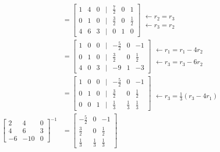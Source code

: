 \documentclass[12pt]{article}
\begin{document}
\begin{enumerate}
\begin{align*}
        \\ &= \begin{bmatrix}
            1& 4 &0 &|& \frac{7}{2} & 0&1
            \\ 0& 1 &0 &|& \frac{3}{2}&0&\frac{1}{2}
            \\ 4&6&3 &|& 0&1&0
            \end{bmatrix} \begin{matrix}  \\ \leftarrow r_2 = r_3 \\ \leftarrow r_3=r_2   \end{matrix}  
        \\ &= \begin{bmatrix}
            1& 0 &0 &|&- \frac{5}{2} & 0&-1
            \\ 0& 1 &0 &|& \frac{3}{2}&0&\frac{1}{2}
            \\ 4&0&3 &|& -9&1&-3
            \end{bmatrix} \begin{matrix} \leftarrow r_1 = r_1-4r_2 \\ \\ \leftarrow r_3=r_3-6r_2   \end{matrix}  
        \\ &= \begin{bmatrix}
            1& 0 &0 &|&- \frac{5}{2} & 0&-1
            \\ 0& 1 &0 &|& \frac{3}{2}&0&\frac{1}{2}
            \\ 0&0&1 &|& \frac{1}{3} &\frac{1}{3}& \frac{1}{3}
            \end{bmatrix} \begin{matrix} \\ \\ \leftarrow r_3=\frac{1}{3}(r_3-4r_1)   \end{matrix}  
        \\ \begin{bmatrix}
        2&4&0 \\ 4&6&3\\ -6&-10&0\end{bmatrix}^{-1} 
        &= \begin{bmatrix}
            - \frac{5}{2} & 0&-1
            \\\frac{3}{2}&0&\frac{1}{2}
            \\ \frac{1}{3} &\frac{1}{3}& \frac{1}{3}
            \end{bmatrix} 
    \end{align*}
\end{enumerate}
\end{document}
